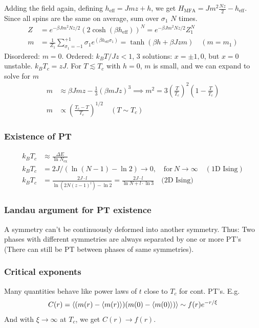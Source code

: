 \documentclass[a4paper, english, 12pt]{article}
\newcommand{\closed}[1]{\left( #1 \right)}
\begin{document}
\begin{multicols*}{2}
Adding the field again, defining $h_\mathrm{eff}=Jmz+h$, we get $H_\mathrm{MFA}=Jm^2 \frac{Nz}{2} - h_{\mathrm{eff}}$. Since all spins are the same on average, sum over $\sigma_1$ $N$ times. 
\begin{align*}
    Z &= e^{-\beta J m^2 Nz/2} \closed{2\cosh(\beta h_{\mathrm{eff}})}^N = e^{-\beta J m^2 Nz/2} Z_1^N \\
    m &= \frac{1}{Z_1} \sum_{\sigma_1=-1}^{+1} \sigma_1 e^{(\beta h_{\mathrm{eff}}\sigma_1)} = \tanh(\beta h + \beta Jzm)\quad(m=m_1)
\end{align*}
Disordered: $m=0$. Ordered: $k_B T/Jz < 1$, $3$ solutions: $x=\pm1,0$, but $x=0$ unstable. $k_B T_c=zJ$. For $T\lesssim T_c$ with $h=0$, $m$ is small, and we can expand to solve for $m$
\begin{align*}
    m &\approx \beta J m z - \frac{1}{3} (\beta m J z)^3 \implies m^2 = 3 \closed{\frac{T}{T_c}}^2 \closed{1-\frac{T}{T_c}} \\
    m &\propto \closed{\frac{T_c-T}{T_c}}^{1/2}\quad(T\sim T_c)
\end{align*}


\subsubsection*{\tiny Existence of PT} 

\begin{align*}
    k_B T_c &\approx \frac{\Delta E}{\ln N_\mathrm{ex}} \\
    k_B T_c &= 2J/(\ln(N-1)-\ln 2) \to 0,\quad\text{for}\: N\to\infty\quad(\text{1D Ising}) \\
    k_B T_c &= \frac{2J\cdot l}{\ln(2N(z-1)^l)-\ln2} = \frac{2J \cdot l}{\ln N + l\cdot \ln3}\quad \text{(2D Ising)}
\end{align*} 


\subsubsection*{\tiny Landau argument for PT existence}
A symmetry can't be continuously deformed into another symmetry. Thus: Two phases with different symmetries are always separated by one or more PT's (There can still be PT between phases of same symmetries).


\subsubsection*{\scriptsize Critical exponents}
Many quantities behave like power laws of $t$ close to $T_c$ for cont. PT's. E.g. 
\begin{align*}
    C(r) = \expval{(m(r) - \expval{m(r)})(m(0) - \expval{m(0)})} \sim f(r) e^{-r/ \xi} 
\end{align*}
And with $\xi\to\infty$ at $T_c$, we get $C(r)\to f(r)$. 


\end{multicols*}
\end{document}
